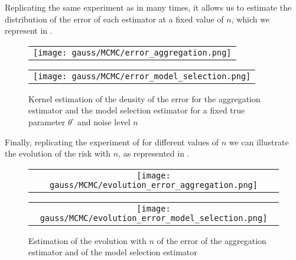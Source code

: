 Replicating the same experiment as in  many times, it allows us to estimate the distribution of the error of each estimator at a fixed value of $n$, which we represent in .

\begin{figure}
  \centering
  \begin{tabular}{@{}c@{}}
    \texttt{[image: gauss/MCMC/error\_aggregation.png]} \\[\abovecaptionskip]
  \end{tabular}
  \begin{tabular}{@{}c@{}}
    \texttt{[image: gauss/MCMC/error\_model\_selection.png]} \\[\abovecaptionskip]
  \end{tabular}
  \caption{Kernel estimation of the density of the error for the aggregation estimator and the model selection estimator for a fixed true parameter $\theta^{\circ}$ and noise level $n$}
  \label{fig:freq:igssm:error:mcmc}
\end{figure}

Finally, replicating the experiment of  for different values of $n$ we can illustrate the evolution of the risk with $n$, as represented in .

\begin{figure}
  \centering
  \begin{tabular}{@{}c@{}}
    \texttt{[image: gauss/MCMC/evolution\_error\_aggregation.png]} \\[\abovecaptionskip]
  \end{tabular}
  \begin{tabular}{@{}c@{}}
    \texttt{[image: gauss/MCMC/evolution\_error\_model\_selection.png]} \\[\abovecaptionskip]
  \end{tabular}
  \caption{Estimation of the evolution with $n$ of the error of the aggregation estimator and of the model selection estimator}
  \label{fig:freq:igssm:error:evol}
\end{figure}

